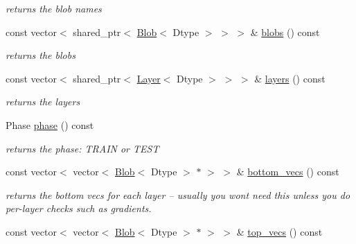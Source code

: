 \begin{DoxyCompactItemize}
\begin{DoxyCompactList}\small\item\em returns the blob names \end{DoxyCompactList}\item 
const vector$<$ shared\+\_\+ptr$<$ \hyperlink{classcaffe_1_1Blob}{Blob}$<$ Dtype $>$ $>$ $>$ \& \hyperlink{classcaffe_1_1Net_a4d8f7324b2b40b09bc3cbf16104576dc}{blobs} () const \hypertarget{classcaffe_1_1Net_a4d8f7324b2b40b09bc3cbf16104576dc}{}\label{classcaffe_1_1Net_a4d8f7324b2b40b09bc3cbf16104576dc}

\begin{DoxyCompactList}\small\item\em returns the blobs \end{DoxyCompactList}\item 
const vector$<$ shared\+\_\+ptr$<$ \hyperlink{classcaffe_1_1Layer}{Layer}$<$ Dtype $>$ $>$ $>$ \& \hyperlink{classcaffe_1_1Net_a74320943ecc3c9e3da1dca1ba9f60034}{layers} () const \hypertarget{classcaffe_1_1Net_a74320943ecc3c9e3da1dca1ba9f60034}{}\label{classcaffe_1_1Net_a74320943ecc3c9e3da1dca1ba9f60034}

\begin{DoxyCompactList}\small\item\em returns the layers \end{DoxyCompactList}\item 
Phase \hyperlink{classcaffe_1_1Net_a73a53387587ebcab5c3317343121f07b}{phase} () const \hypertarget{classcaffe_1_1Net_a73a53387587ebcab5c3317343121f07b}{}\label{classcaffe_1_1Net_a73a53387587ebcab5c3317343121f07b}

\begin{DoxyCompactList}\small\item\em returns the phase\+: T\+R\+A\+IN or T\+E\+ST \end{DoxyCompactList}\item 
const vector$<$ vector$<$ \hyperlink{classcaffe_1_1Blob}{Blob}$<$ Dtype $>$ $\ast$ $>$ $>$ \& \hyperlink{classcaffe_1_1Net_a41abdf5ab1e3ed6f6b0bc6ce67aa80a6}{bottom\+\_\+vecs} () const \hypertarget{classcaffe_1_1Net_a41abdf5ab1e3ed6f6b0bc6ce67aa80a6}{}\label{classcaffe_1_1Net_a41abdf5ab1e3ed6f6b0bc6ce67aa80a6}

\begin{DoxyCompactList}\small\item\em returns the bottom vecs for each layer -- usually you won\textquotesingle{}t need this unless you do per-\/layer checks such as gradients. \end{DoxyCompactList}\item 
const vector$<$ vector$<$ \hyperlink{classcaffe_1_1Blob}{Blob}$<$ Dtype $>$ $\ast$ $>$ $>$ \& \hyperlink{classcaffe_1_1Net_ac62747bbea9f8036f776bc320d8c3fa8}{top\+\_\+vecs} () const \hypertarget{classcaffe_1_1Net_ac62747bbea9f8036f776bc320d8c3fa8}{}\label{classcaffe_1_1Net_ac62747bbea9f8036f776bc320d8c3fa8}


\end{DoxyCompactItemize}
